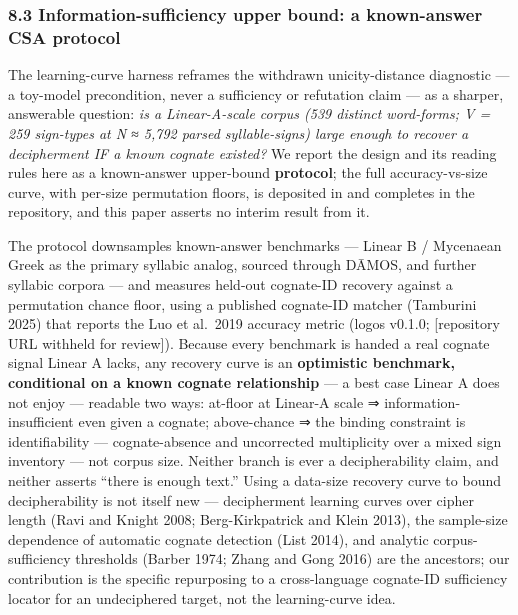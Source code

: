 \documentclass[
  10pt,
]{article}
\begin{document}
\hypertarget{information-sufficiency-upper-bound-a-known-answer-csa-protocol}{%
\subsubsection{8.3 Information-sufficiency upper bound: a known-answer
CSA
protocol}\label{information-sufficiency-upper-bound-a-known-answer-csa-protocol}}

The learning-curve harness reframes the withdrawn unicity-distance
diagnostic --- a toy-model precondition, never a sufficiency or
refutation claim --- as a sharper, answerable question: \emph{is a
Linear-A-scale corpus (539 distinct word-forms; V = 259 sign-types at N
≈ 5,792 parsed syllable-signs) large enough to recover a decipherment IF
a known cognate existed?} We report the design and its reading rules
here as a known-answer upper-bound \textbf{protocol}; the full
accuracy-vs-size curve, with per-size permutation floors, is deposited
in and completes in the repository, and this paper asserts no interim
result from it.

The protocol downsamples known-answer benchmarks --- Linear B /
Mycenaean Greek as the primary syllabic analog, sourced through DĀMOS,
and further syllabic corpora --- and measures held-out cognate-ID
recovery against a permutation chance floor, using a published
cognate-ID matcher (Tamburini 2025) that reports the Luo et al.~2019
accuracy metric (logos v0.1.0; {[}repository URL withheld for
review{]}). Because every benchmark is handed a real cognate signal
Linear A lacks, any recovery curve is an \textbf{optimistic benchmark,
conditional on a known cognate relationship} --- a best case Linear A
does not enjoy --- readable two ways: at-floor at Linear-A scale ⇒
information-insufficient even given a cognate; above-chance ⇒ the
binding constraint is identifiability --- cognate-absence and
uncorrected multiplicity over a mixed sign inventory --- not corpus
size. Neither branch is ever a decipherability claim, and neither
asserts ``there is enough text.'' Using a data-size recovery curve to
bound decipherability is not itself new --- decipherment learning curves
over cipher length (Ravi and Knight 2008; Berg-Kirkpatrick and Klein
2013), the sample-size dependence of automatic cognate detection (List
2014), and analytic corpus-sufficiency thresholds (Barber 1974; Zhang
and Gong 2016) are the ancestors; our contribution is the specific
repurposing to a cross-language cognate-ID sufficiency locator for an
undeciphered target, not the learning-curve idea.
\end{document}
